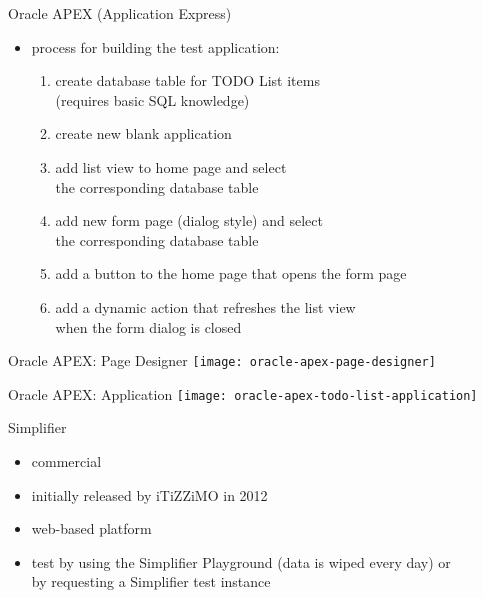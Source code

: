 \documentclass[aspectratio=169]{beamer}
\begin{document}
  \begin{frame}{Oracle APEX (Application Express)}
    \begin{itemize}
      \item process for building the test application:
        \begin{enumerate}
          \item create database table for TODO List items \\
                (requires basic SQL knowledge)
          \item create new blank application
          \item add list view to home page and select \\
                the corresponding database table
          \item add new form page (dialog style) and select \\
                the corresponding database table
          \item add a button to the home page that opens the form page
          \item add a dynamic action that refreshes the list view \\
                when the form dialog is closed
        \end{enumerate}
    \end{itemize}
  \end{frame}

  \begin{frame}[standout]{Oracle APEX: Page Designer}
    \texttt{[image: oracle-apex-page-designer]}
  \end{frame}

  \begin{frame}[standout]{Oracle APEX: Application}
    \texttt{[image: oracle-apex-todo-list-application]}
  \end{frame}

  \begin{frame}{Simplifier}
    \begin{itemize}
      \item commercial
      \item initially released by iTiZZiMO in 2012
      \item web-based platform
      \item test by using the Simplifier Playground (data is wiped every day) or \\
            by requesting a Simplifier test instance
    \end{itemize}
  \end{frame}
\end{document}
